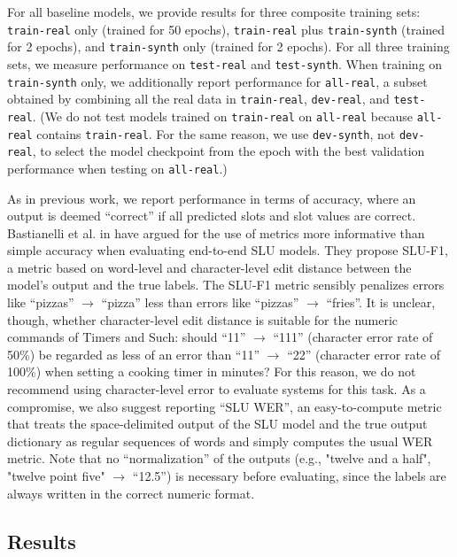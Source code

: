 \documentclass{article}
\begin{document}
For all baseline models, we provide results for three composite training sets: \texttt{train-real} only (trained for 50 epochs), \texttt{train-real} plus \texttt{train-synth} (trained for 2 epochs), and \texttt{train-synth} only (trained for 2 epochs). For all three training sets, we measure performance on \texttt{test-real} and \texttt{test-synth}. When training on \texttt{train-synth} only, we additionally report performance for \texttt{all-real}, a subset obtained by combining all the real data in \texttt{train-real}, \texttt{dev-real}, and \texttt{test-real}. (We do not test models trained on \texttt{train-real} on \texttt{all-real} because \texttt{all-real} contains \texttt{train-real}. For the same reason, we use \texttt{dev-synth}, not \texttt{dev-real}, to select the model checkpoint from the epoch with the best validation performance when testing on \texttt{all-real}.)

As in previous work, we report performance in terms of accuracy, where an output is deemed ``correct'' if all predicted slots and slot values are correct. Bastianelli et al. in \cite{slurp} have argued for the use of metrics more informative than simple accuracy when evaluating end-to-end SLU models. They propose SLU-F1, a metric based on word-level and character-level edit distance between the model's output and the true labels. The SLU-F1 metric sensibly penalizes errors like ``pizzas'' $\rightarrow$ ``pizza'' less than errors like ``pizzas'' $\rightarrow$ ``fries''. It is unclear, though, whether character-level edit distance is suitable for the numeric commands of Timers and Such: should ``11'' $\rightarrow$ ``111'' (character error rate of 50\%) be regarded as less of an error than ``11'' $\rightarrow$ ``22'' (character error rate of 100\%) when setting a cooking timer in minutes? For this reason, we do not recommend using character-level error to evaluate systems for this task. As a compromise, we also suggest reporting ``SLU WER'', an easy-to-compute metric that treats the space-delimited output of the SLU model and the true output dictionary as regular sequences of words and simply computes the usual WER metric. Note that no ``normalization'' of the outputs (e.g., "twelve and a half", "twelve point five" $\to$ ``12.5'') is necessary before evaluating, since the labels are always written in the correct numeric format.

\subsection{Results}\label{results-text}
\end{document}
